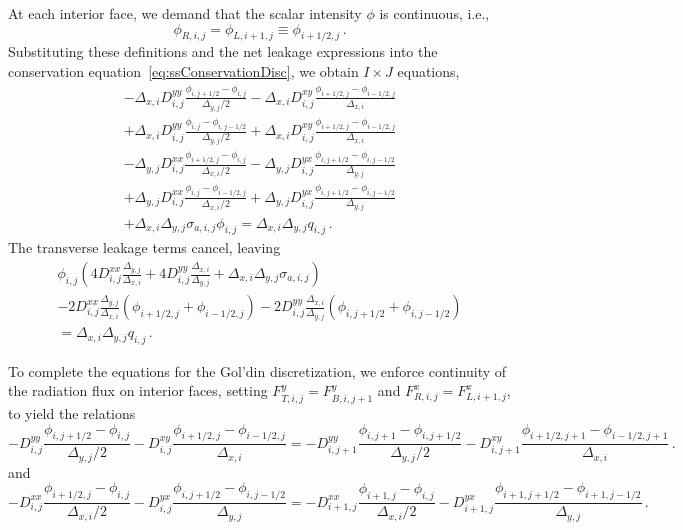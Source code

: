 At each interior face, we demand that the scalar intensity $\phi$ is continuous,
i.e.,
\begin{equation*}
  \phi_{R,i,j} = \phi_{L,i+1,j} \equiv \phi_{i+1/2,j}\,.
\end{equation*}
Substituting these definitions and the net leakage expressions into the
conservation equation~\eqref{eq:ssConservationDisc}, we obtain $I\times J$
equations,
\begin{multline*}
- \Delta_{x,i} D_{i,j}^{yy}\frac{\phi_{i,j+1/2} - \phi_{i,j}}{\Delta_{y,j} / 2}
- \Delta_{x,i} D_{i,j}^{xy}\frac{\phi_{i+1/2,j} - \phi_{i-1/2,j}}{\Delta_{x,i} }
\\
+ \Delta_{x,i} D_{i,j}^{yy}\frac{\phi_{i,j} - \phi_{i,j-1/2}}{\Delta_{y,j} / 2}
+ \Delta_{x,i} D_{i,j}^{xy}\frac{\phi_{i+1/2,j} - \phi_{i-1/2,j}}{\Delta_{x,i} }
\\
- \Delta_{y,j} D_{i,j}^{xx}\frac{\phi_{i+1/2,j} - \phi_{i,j}}{\Delta_{x,i} / 2}
- \Delta_{y,j} D_{i,j}^{yx}\frac{\phi_{i,j+1/2} - \phi_{i,j-1/2}}{\Delta_{y,j} }
\\
+ \Delta_{y,j} D_{i,j}^{xx}\frac{\phi_{i,j} - \phi_{i-1/2,j}}{\Delta_{x,i} / 2}
+ \Delta_{y,j} D_{i,j}^{yx}\frac{\phi_{i,j+1/2} - \phi_{i,j-1/2}}{\Delta_{y,j} }
\\
+ \Delta_{x,i}\Delta_{y,j} \sigma_{a,i,j} \phi_{i,j}
= \Delta_{x,i}\Delta_{y,j} q_{i,j}\,.
\end{multline*}
The transverse leakage terms cancel, leaving
\begin{multline*}
\phi_{i,j} \left(
   4 D_{i,j}^{xx} \frac{\Delta_{y,j}}{\Delta_{x,i}}
 + 4 D_{i,j}^{yy} \frac{\Delta_{x,i}}{\Delta_{y,j}}
 + \Delta_{x,i}\Delta_{y,j} \sigma_{a,i,j} \right)
 \\
- 2 D_{i,j}^{xx} \frac{\Delta_{y,j}}{\Delta_{x,i}}
  \left( \phi_{i+1/2,j} + \phi_{i-1/2,j} \right)
- 2 D_{i,j}^{yy} \frac{\Delta_{x,i}}{\Delta_{y,j}}
  \left( \phi_{i,j+1/2} + \phi_{i,j-1/2} \right)
\\= \Delta_{x,i}\Delta_{y,j} q_{i,j}\,.
\end{multline*}

To complete the equations for the Gol'din discretization, we enforce continuity
of the radiation flux on interior faces, setting $F_{T,i,j}^y = F_{B,i,j+1}^y$
and $F_{R,i,j}^x = F_{L,i+1,j}^x$, to yield the relations
\begin{equation*}
- D_{i,j}^{yy} \frac{\phi_{i,j+1/2} - \phi_{i,j}}{ \Delta_{y,j} / 2}
- D_{i,j}^{xy} \frac{\phi_{i+1/2,j} - \phi_{i-1/2,j}}{ \Delta_{x,i} }
=
- D_{i,j+1}^{yy} \frac{\phi_{i,j+1} - \phi_{i,j+1/2}}{ \Delta_{y,j} / 2}
- D_{i,j+1}^{xy} \frac{\phi_{i+1/2,j+1} - \phi_{i-1/2,j+1}}{ \Delta_{x,i} }\,.
\end{equation*}
and
\begin{equation*}
- D_{i,j}^{xx} \frac{\phi_{i+1/2,j} - \phi_{i,j}}{ \Delta_{x,i} / 2}
- D_{i,j}^{yx} \frac{\phi_{i,j+1/2} - \phi_{i,j-1/2}}{ \Delta_{y,j} }
=
- D_{i+1,j}^{xx} \frac{\phi_{i+1,j} - \phi_{i,j}}{ \Delta_{x,i} / 2}
- D_{i+1,j}^{yx} \frac{\phi_{i+1,j+1/2} - \phi_{i+1,j-1/2}}{ \Delta_{y,j} }\,.
\end{equation*}

